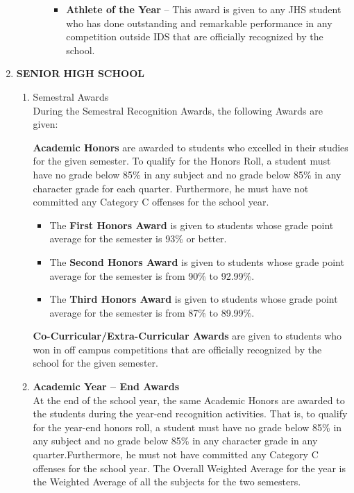 \begin{enumerate}[label=(\Alph*)]
\begin{enumerate}[label=\Alph{enumi}.\arabic*]
\begin{enumerate}[label=\arabic*.]
\begin{itemize}
				\item  \textbf{Athlete of the Year} – This award is given to any JHS student who has done outstanding and remarkable performance in any competition outside IDS that are officially recognized by the school.
			\end{itemize}
		\end{enumerate}
	\end{enumerate}
	
	\item  \textbf{SENIOR HIGH SCHOOL}
	\begin{enumerate}[label=\Alph{enumi}.\arabic*]
		\item  Semestral Awards \\
		\noindent During the Semestral Recognition Awards, the following Awards are given:
		
		\textbf{Academic Honors} are awarded to students who excelled in their studies for the given semester. To qualify for the Honors Roll, a student must have no grade below 85\% in any subject and no grade below 85\% in any character grade for each quarter. Furthermore, he must have not committed any Category C offenses for the school year.
		\begin{itemize}
			\item  The \textbf{First Honors Award} is given to students whose grade point average for the semester is 93\% or better.
			\item  The \textbf{Second Honors Award} is given to students whose grade point average for the semester is from 90\% to 92.99\%.
			\item  The \textbf{Third Honors Award} is given to students whose grade point average for the semester is from 87\% to 89.99\%.
		\end{itemize}
		
		\textbf{Co-Curricular/Extra-Curricular Awards} are given to students who won in off campus competitions that are officially recognized by the school for the given semester. 
		
		\item \textbf{Academic Year – End Awards} \\
		At the end of the school year, the same Academic Honors are awarded to the students during the year-end recognition activities. That is, to qualify for the year-end honors roll, a student must have no grade below 85\% in any subject and no grade below 85\% in any character grade in any quarter.Furthermore, he must not have committed any Category C offenses for the school year. The Overall Weighted Average for the year is the Weighted Average of all the subjects for the two semesters.
		

\end{enumerate}
\end{enumerate}
